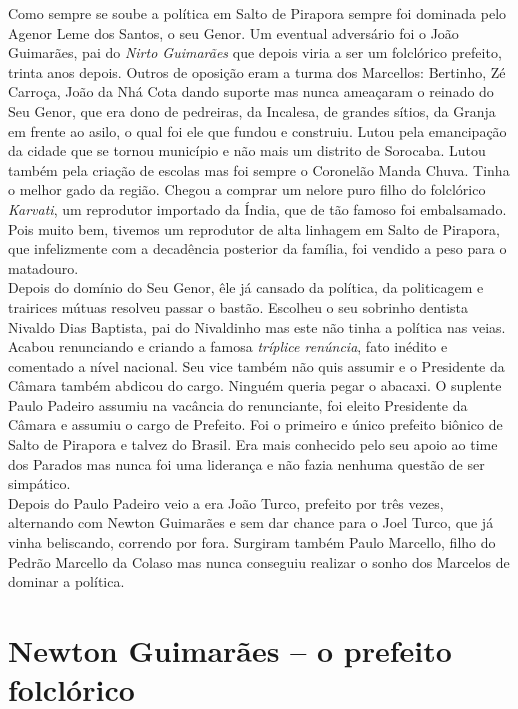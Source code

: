 \documentclass[12pt,brazil,]{book}
\begin{document}
Como sempre se soube a política em Salto de Pirapora sempre foi dominada
pelo Agenor Leme dos Santos, o seu Genor. Um eventual adversário foi o
João Guimarães, pai do \emph{Nirto Guimarães} que depois viria a ser um
folclórico prefeito, trinta anos depois. Outros de oposição eram a turma
dos Marcellos: Bertinho, Zé Carroça, João da Nhá Cota dando suporte mas
nunca ameaçaram o reinado do Seu Genor, que era dono de pedreiras, da
Incalesa, de grandes sítios, da Granja em frente ao asilo, o qual foi
ele que fundou e construiu. Lutou pela emancipação da cidade que se
tornou município e não mais um distrito de Sorocaba. Lutou também pela
criação de escolas mas foi sempre o Coronelão Manda Chuva. Tinha o
melhor gado da região. Chegou a comprar um nelore puro filho do
folclórico \emph{Karvati}, um reprodutor importado da Índia, que de tão
famoso foi embalsamado. Pois muito bem, tivemos um reprodutor de alta
linhagem em Salto de Pirapora, que infelizmente com a decadência
posterior da família, foi vendido a peso para o matadouro.\\
Depois do domínio do Seu Genor, êle já cansado da política, da
politicagem e trairices mútuas resolveu passar o bastão. Escolheu o seu
sobrinho dentista Nivaldo Dias Baptista, pai do Nivaldinho mas este não
tinha a política nas veias. Acabou renunciando e criando a famosa
\emph{tríplice renúncia}, fato inédito e comentado a nível nacional. Seu
vice também não quis assumir e o Presidente da Câmara também abdicou do
cargo. Ninguém queria pegar o abacaxi. O suplente Paulo Padeiro assumiu
na vacância do renunciante, foi eleito Presidente da Câmara e assumiu o
cargo de Prefeito. Foi o primeiro e único prefeito biônico de Salto de
Pirapora e talvez do Brasil. Era mais conhecido pelo seu apoio ao time
dos Parados mas nunca foi uma liderança e não fazia nenhuma questão de
ser simpático.\\
Depois do Paulo Padeiro veio a era João Turco, prefeito por três vezes,
alternando com Newton Guimarães e sem dar chance para o Joel Turco, que
já vinha beliscando, correndo por fora. Surgiram também Paulo Marcello,
filho do Pedrão Marcello da Colaso mas nunca conseguiu realizar o sonho
dos Marcelos de dominar a política.

\section{Newton Guimarães -- o prefeito
folclórico}\label{newton-guimaruxe3es-o-prefeito-folcluxf3rico}
\end{document}
